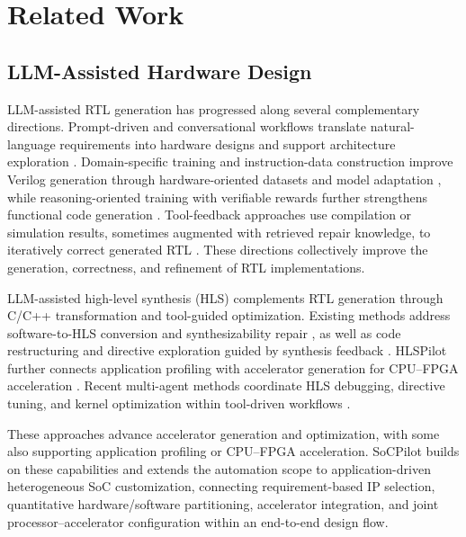 \section{Related Work}
\subsection{LLM-Assisted Hardware Design}
LLM-assisted RTL generation has progressed along several complementary directions. Prompt-driven and conversational workflows translate natural-language requirements into hardware designs and support architecture exploration \cite{fu2023gpt4aigchip,blocklove2023chipchat,chang2023chipgpt}. Domain-specific training and instruction-data construction improve Verilog generation through hardware-oriented datasets and model adaptation \cite{thakur2024verigen,liu2025rtlcoder,zhao2024codev}, while reasoning-oriented training with verifiable rewards further strengthens functional code generation \cite{zhu2025codevr1}. Tool-feedback approaches use compilation or simulation results, sometimes augmented with retrieved repair knowledge, to iteratively correct generated RTL \cite{thakur2024autochipautomatinghdlgeneration,tsai2024rtlfixerautomaticallyfixingrtl}. These directions collectively improve the generation, correctness, and refinement of RTL implementations.

LLM-assisted high-level synthesis (HLS) complements RTL generation through C/C++ transformation and tool-guided optimization. Existing methods address software-to-HLS conversion and synthesizability repair \cite{collini2024c2hlsc,xu2024hlsrepair}, as well as code restructuring and directive exploration guided by synthesis feedback \cite{xiong2024hlspilot,yao2025llm4hls,collini2025agentichls}. HLSPilot further connects application profiling with accelerator generation for CPU--FPGA acceleration \cite{xiong2024hlspilot}. Recent multi-agent methods coordinate HLS debugging, directive tuning, and kernel optimization within tool-driven workflows \cite{li2026chathls,bhandwaldar2026agentfactories}.

These approaches advance accelerator generation and optimization, with some also supporting application profiling or CPU--FPGA acceleration. SoCPilot builds on these capabilities and extends the automation scope to application-driven heterogeneous SoC customization, connecting requirement-based IP selection, quantitative hardware/software partitioning, accelerator integration, and joint processor--accelerator configuration within an end-to-end design flow.
 
